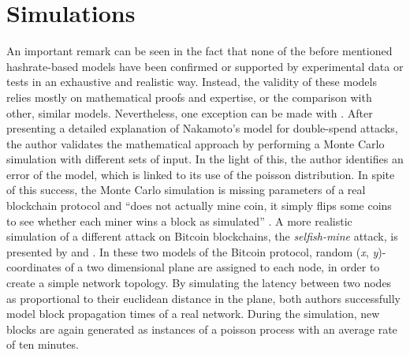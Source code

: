 \documentclass[a4paper,12pt,twoside]{report}
\begin{document}
\section{Simulations}
An important remark can be seen in the fact that none of the before mentioned hashrate-based models have been confirmed or supported by experimental data or tests in an exhaustive and realistic way. Instead, the validity of these models relies mostly on mathematical proofs and expertise, or the comparison with other, similar models. Nevertheless, one exception can be made with \cite{NakamotoExplMCSim}. After presenting a detailed explanation of Nakamoto's model for double-spend attacks, the author validates the mathematical approach by performing a Monte Carlo simulation \cite{montecarlo} with different sets of input. In the light of this, the author identifies an error of the model, which is linked to its use of the poisson distribution. In spite of this success, the Monte Carlo simulation is missing parameters of a real blockchain protocol and ``does not actually mine coin, it simply flips some coins to see whether each miner wins a block as simulated'' \cite{NakamotoExplMCSim}. A more realistic simulation of a different attack on Bitcoin blockchains, the \textit{selfish-mine} attack, is presented by \cite{mwalemodel} and \cite{selfishmine2}. In these two models of the Bitcoin protocol, random (\textit{x}, \textit{y})-coordinates of a two dimensional plane are assigned to each node, in order to create a simple network topology. By simulating the latency between two nodes as proportional to their euclidean distance in the plane, both authors successfully model block propagation times of a real network. During the simulation, new blocks are again generated as instances of a poisson process with an average rate of ten minutes. 
\end{document}
